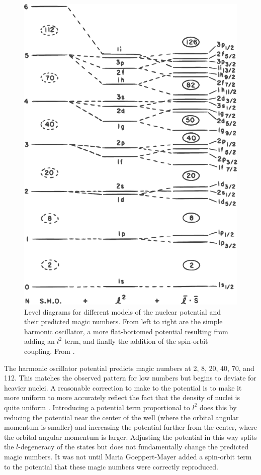 \begin{figure}[htp]
\centering
\includegraphics[height=0.8\textheight]{figures/nuclearLevels.eps}
\caption{Level diagrams for different models of the nuclear potential and their predicted magic numbers.  From left to right are the simple harmonic oscillator, a more flat-bottomed potential resulting from adding an $l^2$ term, and finally the addition of the spin-orbit coupling.  From \citep{Casten}.}
\label{fig:shellModelMagic}
\end{figure}
The harmonic oscillator potential predicts magic numbers at 2, 8, 20, 40, 70, and 112.  This matches the observed pattern for low numbers but begins to deviate for heavier nuclei.  A reasonable correction to make to the potential is to make it more uniform to more accurately reflect the fact that the density of nuclei is quite uniform \citep{Casten}.  Introducing a potential term proportional to $l^2$ does this by reducing the potential near the center of the well (where the orbital angular momentum is smaller) and increasing the potential further from the center, where the orbital angular momentum is larger.  Adjusting the potential in this way splits the $l$-degeneracy of the states but does not fundamentally change the predicted magic numbers.  It was not until Maria Goeppert-Mayer added a spin-orbit term to the potential \citep{MGM} that these magic numbers were correctly reproduced.  

